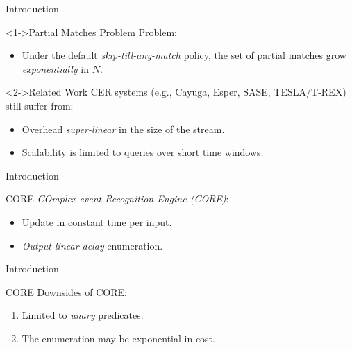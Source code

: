 \documentclass[xcolor=pdftex,dvipsnames,table]{beamer}
\begin{document}

\begin{frame}{Introduction}
 \begin{block}<1->{Partial Matches Problem}
   Problem:
   \begin{itemize}
     \item Under the default \emph{skip-till-any-match} \cite{skip-till-any-match} policy, the set of partial matches grow \emph{exponentially} in $N$.
   \end{itemize}
 \end{block}
 \begin{block}<2->{Related Work}
    CER systems (e.g., Cayuga, Esper, SASE, TESLA/T-REX) still suffer from:
    \begin{itemize}
      \item Overhead \emph{super-linear} in the size of the stream.
      \item Scalability is limited to queries over short time windows.
    \end{itemize}
  \end{block}
\end{frame}


\begin{frame}{Introduction}
  \begin{block}{CORE}
   \emph{COmplex event Recognition Engine (CORE)\cite{core}}:
   \begin{itemize}
      \item Update in constant time per input.
      \item \emph{Output-linear delay} enumeration.
   \end{itemize}
 \end{block}
\end{frame}

\begin{frame}{Introduction}
  \begin{block}{CORE}
    Downsides of CORE:
   \begin{enumerate}
     \item Limited to \emph{unary} predicates.
     \pause
     \item The enumeration may be exponential in cost.
   \end{enumerate}
 \end{block}
\end{frame}

\end{document}

